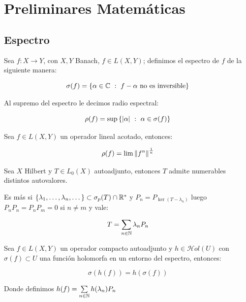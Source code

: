 \section{Preliminares Matem\'aticas}

\subsection{Espectro}

\begin{definition}
	Sea $f : X \rightarrow Y$, con $X,Y$ Banach, $f \in L(X,Y)$; definimos el espectro de $f$ de la siguiente manera:
	
	\begin{equation*}
		\sigma(f) = \left\lbrace\alpha \in \mathbb{C} ~:~ f- \alpha \text{ no es inversible}\right\rbrace
	\end{equation*}
	
	Al supremo del espectro le decimos radio espectral:
	
	\begin{equation*}
	\rho(f) = \sup \left\lbrace\left\lvert\alpha\right\rvert ~:~ \alpha \in \sigma(f)\right\rbrace
	\end{equation*}
	
\end{definition}

\begin{proposition}
	\label{prop: teorema de gelfand}
	Sea $f \in L(X,Y)$ un operador lineal acotado, entonces:
	
	\begin{equation*}
		\rho(f) = \lim \left\lVert f^n\right\rVert^{\frac{1}{n}}
	\end{equation*}
	
\end{proposition}

\begin{theorem}
	Sea $X$ Hilbert y $T \in L_0(X)$ autoadjunto, entonces $T$ admite numerables distintos autovalores. 
	
	Es m\'as si $\left\lbrace\lambda_1, \dots, \lambda_n, \dots\right\rbrace \subset \sigma_p(T) \cap {\mathbb{R}}^{\ast}$ y $P_n = P_{\ker(T-\lambda_n)}$ luego $P_nP_n = P_nP_m = 0$ si $n \neq m$ y vale:
	
	\begin{equation}
	\label{eq: Teorema espectral}
	T = \sum\limits_{n \in {\mathbb{N}}}{\lambda_n P_n}
	\end{equation}
\end{theorem}

\begin{proposition}
	\label{prop: calculo funcional}
	
	Sea $f \in L(X,Y)$ un operador compacto autoadjunto y $h \in \mathcal{H}ol (U)$ con $\sigma(f) \subset U$ una funci\'on holomorfa en un entorno del espectro, entonces:
	
	\begin{equation*}
		\sigma \left(h(f)\right) = h(\sigma(f))
	\end{equation*}
	
	Donde definimos $h(f) = \sum\limits_{n \in {\mathbb{N}}}{h(\lambda_n) P_n}$
	
\end{proposition}

